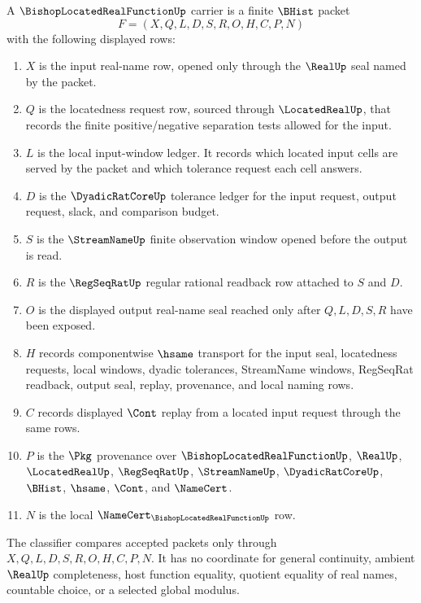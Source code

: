 \begin{definition}
\label{def:bishop-located-real-function-carrier}
A $\BishopLocatedRealFunctionUp$ carrier is a finite $\BHist$ packet
$$
F=(X,Q,L,D,S,R,O,H,C,P,N)
$$
with the following displayed rows:
\begin{enumerate}
\item $X$ is the input real-name row, opened only through the $\RealUp$ seal named by the packet.
\item $Q$ is the locatedness request row, sourced through $\LocatedRealUp$, that records the finite positive/negative separation tests allowed for the input.
\item $L$ is the local input-window ledger. It records which located input cells are served by the packet and which tolerance request each cell answers.
\item $D$ is the $\DyadicRatCoreUp$ tolerance ledger for the input request, output request, slack, and comparison budget.
\item $S$ is the $\StreamNameUp$ finite observation window opened before the output is read.
\item $R$ is the $\RegSeqRatUp$ regular rational readback row attached to $S$ and $D$.
\item $O$ is the displayed output real-name seal reached only after $Q,L,D,S,R$ have been exposed.
\item $H$ records componentwise $\hsame$ transport for the input seal, locatedness requests, local windows, dyadic tolerances, StreamName windows, RegSeqRat readback, output seal, replay, provenance, and local naming rows.
\item $C$ records displayed $\Cont$ replay from a located input request through the same rows.
\item $P$ is the $\Pkg$ provenance over $\BishopLocatedRealFunctionUp$, $\RealUp$, $\LocatedRealUp$, $\RegSeqRatUp$, $\StreamNameUp$, $\DyadicRatCoreUp$, $\BHist$, $\hsame$, $\Cont$, and $\NameCert$.
\item $N$ is the local $\NameCert_{\BishopLocatedRealFunctionUp}$ row.
\end{enumerate}
The classifier compares accepted packets only through $X,Q,L,D,S,R,O,H,C,P,N$. It has no coordinate for general continuity, ambient $\RealUp$ completeness, host function equality, quotient equality of real names, countable choice, or a selected global modulus.
\end{definition}

